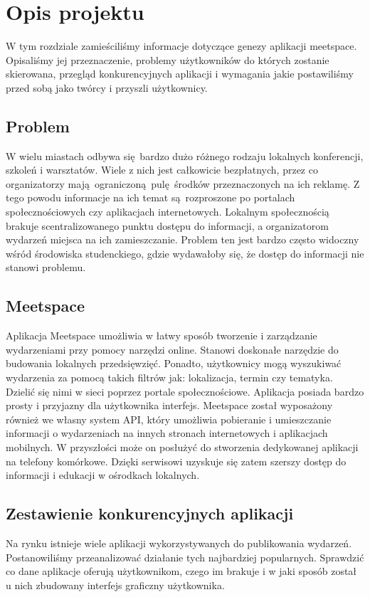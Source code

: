 \section{Opis projektu}
W tym rozdziale zamieściliśmy informacje dotyczące genezy aplikacji meetspace. Opisaliśmy jej przeznaczenie, problemy użytkowników do których zostanie skierowana, przegląd konkurencyjnych aplikacji i wymagania jakie postawiliśmy przed sobą jako twórcy i przyszli użytkownicy.
\subsection{Problem}
W wielu miastach odbywa się bardzo dużo różnego rodzaju lokalnych konferencji, szkoleń i warsztatów. Wiele z nich jest całkowicie bezpłatnych, przez co organizatorzy mają ograniczoną pulę środków przeznaczonych na ich reklamę. Z tego powodu informacje na ich temat są rozproszone po portalach społecznościowych czy aplikacjach internetowych. Lokalnym społecznością brakuje scentralizowanego punktu dostępu do informacji, a organizatorom wydarzeń miejsca na ich zamieszczanie. Problem ten jest bardzo często widoczny wśród środowiska studenckiego, gdzie wydawałoby się, że dostęp do informacji nie stanowi problemu.  
\subsection{Meetspace}
Aplikacja Meetspace umożliwia w łatwy sposób tworzenie i zarządzanie wydarzeniami przy pomocy narzędzi online. Stanowi doskonałe narzędzie do budowania lokalnych przedsięwzięć. Ponadto, użytkownicy mogą wyszukiwać wydarzenia za pomocą takich filtrów jak: lokalizacja, termin czy tematyka. Dzielić się nimi w sieci poprzez portale społecznościowe. Aplikacja posiada bardzo prosty i przyjazny dla użytkownika interfejs. Meetspace został wyposażony również we własny system API, który umożliwia pobieranie i umieszczanie informacji o wydarzeniach na innych stronach internetowych i aplikacjach mobilnych. W przyszłości może on posłużyć do stworzenia dedykowanej aplikacji na telefony komórkowe. Dzięki serwisowi uzyskuje się zatem szerszy dostęp do informacji i edukacji w ośrodkach lokalnych.
\subsection{Zestawienie konkurencyjnych aplikacji}
Na rynku istnieje wiele aplikacji wykorzystywanych do publikowania wydarzeń. Postanowiliśmy przeanalizować działanie tych najbardziej popularnych. Sprawdzić co dane aplikacje oferują użytkownikom, czego im brakuje i w jaki sposób został u nich zbudowany interfejs graficzny użytkownika. \\

